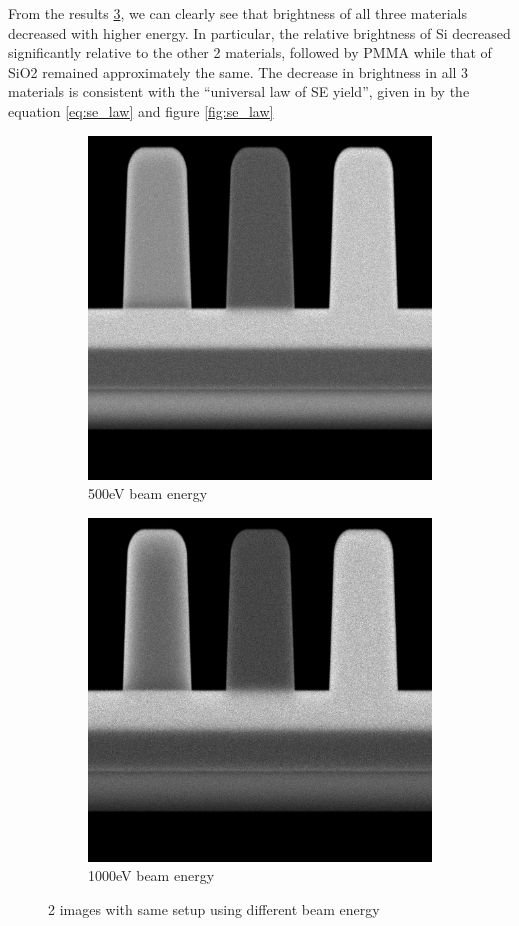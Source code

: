 From the results \ref{fig:diff_beam_energy}, we can clearly see that brightness of all three materials decreased with higher energy. In particular, the relative brightness of Si decreased significantly relative to the other 2 materials, followed by PMMA while that of SiO2 remained approximately the same. The decrease in brightness in all 3 materials is consistent with the ``universal law of SE yield'', given in \cite{lin_newexam} by the equation \ref{eq:se_law} and figure \ref{fig:se_law}

\begin{figure}
\centering
\begin{subfigure}{.5\textwidth}
  \centering
  \includegraphics[width=.75\linewidth]{img/500eV.png}
  \caption{500eV beam energy}
  \label{fig:500eV}
\end{subfigure}%
\begin{subfigure}{.5\textwidth}
  \centering
  \includegraphics[width=.75\linewidth]{img/1000eV.png}
  \caption{1000eV beam energy}
  \label{fig:1000eV}
\end{subfigure}
\caption{2 images with same setup using different beam energy}
\label{fig:diff_beam_energy}
\end{figure}

